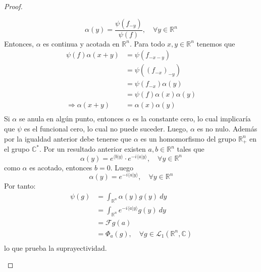 \documentclass[12pt]{report}
\theoremstyle{largebreak}
\newcommand\pint[2]{\ensuremath{\langle#1| #2\rangle}}
\newcommand{\fou}[1]{\ensuremath{\mathcal{F}#1}}
\begin{document}
\begin{proof}
\begin{enumerate}
\begin{equation*}
                \alpha(y)=\frac{\psi(f_{ -y})}{\psi(f)},\quad\forall y\in\mathbb{R}^n
            \end{equation*}
            Entonces, $\alpha$ es continua y acotada en $\mathbb{R}^n$. Para todo $x,y\in\mathbb{R}^n$ tenemos que
            \begin{equation*}
                \begin{split}
                    \psi(f)\alpha(x+y)&=\psi(f_{-x-y})\\
                    &=\psi((f_{-x})_{ -y})\\
                    &=\psi(f_{-x})\alpha(y)\\
                    &=\psi(f)\alpha(x)\alpha(y)\\
                    \Rightarrow \alpha(x+y)&=\alpha(x)\alpha(y)\\
                \end{split}
            \end{equation*}
            Si $\alpha$ se anula en algún punto, entonces $\alpha$ es la constante cero, lo cual implicaría que $\psi$ es el funcional cero, lo cual no puede suceder. Luego, $\alpha$ es no nulo. Además por la igualdad anterior debe tenerse que $\alpha$ es un homomorfismo del grupo $\mathbb{R}^n_+$ en el grupo $\mathbb{C}^*$. Por un resultado anterior existen $a,b\in\mathbb{R}^n$ tales que
            \begin{equation*}
                \alpha(y)=e^{\pint{b}{y}}\cdot e^{-i\pint{a}{y}},\quad\forall y\in\mathbb{R}^n
            \end{equation*}
            como $\alpha$ es acotado, entonces $b=0$. Luego
            \begin{equation*}
                \alpha(y)=e^{-i\pint{a}{y}},\quad\forall y\in\mathbb{R}^n
            \end{equation*}
            Por tanto:
            \begin{equation*}
                \begin{split}
                    \psi(g)&=\int_{\mathbb{R}^n}\alpha(y)g(y)\:dy\\
                    &=\int_{\mathbb{R}^n}e^{ -i\pint{a}{y}}g(y)\:dy\\
                    &=\fou{g}(a)\\
                    &=\Phi_a(g),\quad\forall g\in\mathcal{L}_1(\mathbb{R}^n,\mathbb{C})\\
                \end{split}
            \end{equation*}
            lo que prueba la suprayectividad.
        \end{enumerate}
    \end{proof}
\end{document}
